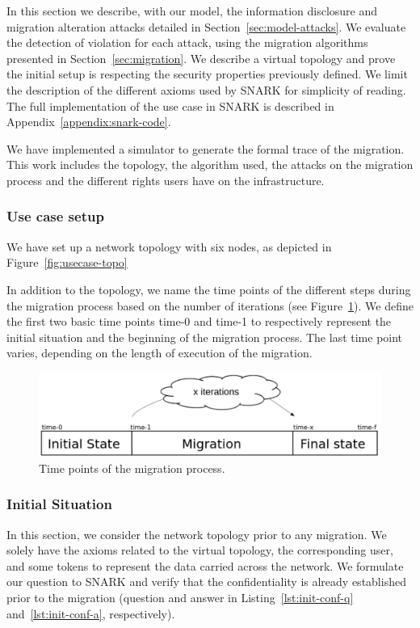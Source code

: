 \label{sec:model-usecase}
In this section we describe, with our model, the information disclosure and migration alteration attacks detailed in Section~\ref{sec:model-attacks}.
We evaluate the detection of violation for each attack, using the migration algorithms presented in Section~\ref{sec:migration}.
We describe a virtual topology and prove the initial setup is respecting the security properties previously defined.
We limit the description of the different axioms used by SNARK for simplicity of reading.
The full implementation of the use case in SNARK is described in Appendix~\ref{appendix:snark-code}.

We have implemented a simulator to generate the formal trace of the migration.
This work includes the topology, the algorithm used, the attacks on the migration process and the different rights users have on the infrastructure.

\subsubsection{Use case setup}
We have set up a network topology with six nodes, as depicted in Figure~\ref{fig:usecase-topo}




In addition to the topology, we name the time points of the different steps during the migration process based on the number of iterations (see Figure~\ref{fig:time-points}).
We define the first two basic time points time-0 and time-1 to respectively represent the initial situation and the beginning of the migration process. The last time point varies, depending on the length of execution of the migration.


\begin{figure}[htbp]
\centering
\includegraphics[scale=0.5]{figures/time-points-evolution} 
\caption{Time points of the migration process.\label{fig:time-points}}
\end{figure}

\subsubsection{Initial Situation}
In this section, we consider the network topology prior to any migration.
We solely have the axioms related to the virtual topology, the corresponding user, and some tokens to represent the data carried across the network.
We formulate our question to SNARK and verify that the confidentiality is already established prior to the migration (question and answer in Listing~\ref{lst:init-conf-q} and~\ref{lst:init-conf-a}, respectively).

